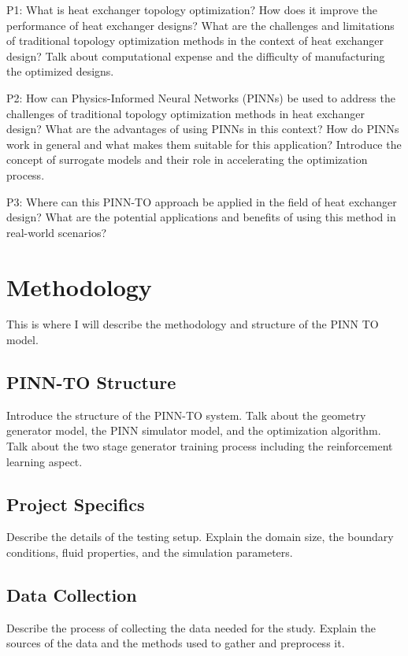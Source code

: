 \documentclass[a4paper,fleqn]{cas-dc}
\begin{document}
P1: What is heat exchanger topology optimization? How does it improve the performance of heat exchanger designs? What are the challenges and limitations of traditional topology optimization methods in the context of heat exchanger design? Talk about computational expense and the difficulty of manufacturing the optimized designs.

P2: How can Physics-Informed Neural Networks (PINNs) be used to address the challenges of traditional topology optimization methods in heat exchanger design? What are the advantages of using PINNs in this context? How do PINNs work in general and what makes them suitable for this application? Introduce the concept of surrogate models and their role in accelerating the optimization process.

P3: Where can this PINN-TO approach be applied in the field of heat exchanger design? What are the potential applications and benefits of using this method in real-world scenarios?

\section{Methodology}\label{sec:methodology}

This is where I will describe the methodology and structure of the PINN TO model.

\subsection{PINN-TO Structure}

Introduce the structure of the PINN-TO system. Talk about the geometry generator model, the PINN simulator model, and the optimization algorithm. Talk about the two stage generator training process including the reinforcement learning aspect.

\subsection{Project Specifics}

Describe the details of the testing setup. Explain the domain size, the boundary conditions, fluid properties, and the simulation parameters.

\subsection{Data Collection}

Describe the process of collecting the data needed for the study. Explain the sources of the data and the methods used to gather and preprocess it.
\end{document}
